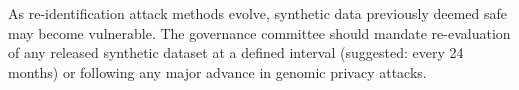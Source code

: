 \begin{recbox}[title={Recommendation 5 — Periodic re-evaluation}]
  As re-identification attack methods evolve, synthetic data previously
  deemed safe may become vulnerable. The governance committee should
  mandate re-evaluation of any released synthetic dataset at a defined
  interval (suggested: every 24 months) or following any major advance
  in genomic privacy attacks.
\end{recbox}

